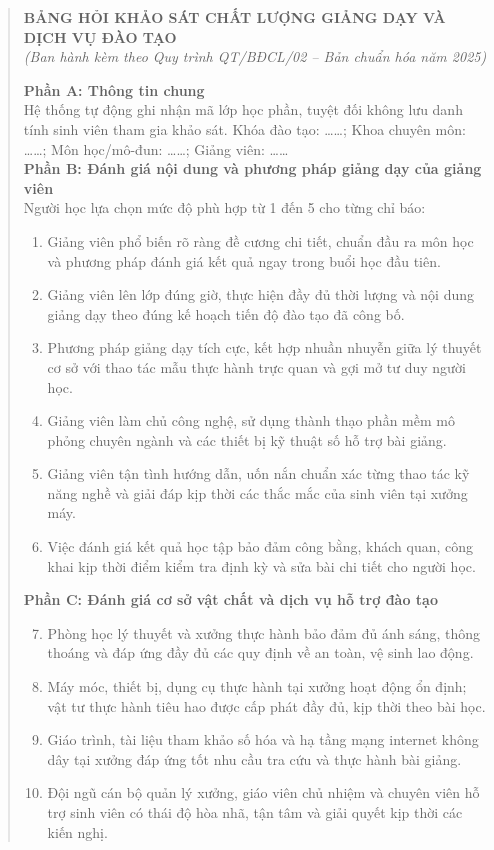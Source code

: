 \begin{quote}
\centering
\textbf{BẢNG HỎI KHẢO SÁT CHẤT LƯỢNG GIẢNG DẠY VÀ DỊCH VỤ ĐÀO TẠO}\\[0.1cm]
\textit{(Ban hành kèm theo Quy trình QT/BĐCL/02 -- Bản chuẩn hóa năm 2025)}\\[0.3cm]
\raggedright

\textbf{Phần A: Thông tin chung}\\[0.15cm]
Hệ thống tự động ghi nhận mã lớp học phần, tuyệt đối không lưu danh tính sinh viên tham gia khảo sát. Khóa đào tạo: \dots\dots; Khoa chuyên môn: \dots\dots; Môn học/mô-đun: \dots\dots; Giảng viên: \dots\dots\\[0.3cm]

\textbf{Phần B: Đánh giá nội dung và phương pháp giảng dạy của giảng viên}\\[0.15cm]
Người học lựa chọn mức độ phù hợp từ 1 đến 5 cho từng chỉ báo:
\begin{enumerate}
    \item Giảng viên phổ biến rõ ràng đề cương chi tiết, chuẩn đầu ra môn học và phương pháp đánh giá kết quả ngay trong buổi học đầu tiên.
    \item Giảng viên lên lớp đúng giờ, thực hiện đầy đủ thời lượng và nội dung giảng dạy theo đúng kế hoạch tiến độ đào tạo đã công bố.
    \item Phương pháp giảng dạy tích cực, kết hợp nhuần nhuyễn giữa lý thuyết cơ sở với thao tác mẫu thực hành trực quan và gợi mở tư duy người học.
    \item Giảng viên làm chủ công nghệ, sử dụng thành thạo phần mềm mô phỏng chuyên ngành và các thiết bị kỹ thuật số hỗ trợ bài giảng.
    \item Giảng viên tận tình hướng dẫn, uốn nắn chuẩn xác từng thao tác kỹ năng nghề và giải đáp kịp thời các thắc mắc của sinh viên tại xưởng máy.
    \item Việc đánh giá kết quả học tập bảo đảm công bằng, khách quan, công khai kịp thời điểm kiểm tra định kỳ và sửa bài chi tiết cho người học.
\end{enumerate}

\textbf{Phần C: Đánh giá cơ sở vật chất và dịch vụ hỗ trợ đào tạo}\\[0.15cm]
\begin{enumerate}
    \setcounter{enumi}{6}
    \item Phòng học lý thuyết và xưởng thực hành bảo đảm đủ ánh sáng, thông thoáng và đáp ứng đầy đủ các quy định về an toàn, vệ sinh lao động.
    \item Máy móc, thiết bị, dụng cụ thực hành tại xưởng hoạt động ổn định; vật tư thực hành tiêu hao được cấp phát đầy đủ, kịp thời theo bài học.
    \item Giáo trình, tài liệu tham khảo số hóa và hạ tầng mạng internet không dây tại xưởng đáp ứng tốt nhu cầu tra cứu và thực hành bài giảng.
    \item Đội ngũ cán bộ quản lý xưởng, giáo viên chủ nhiệm và chuyên viên hỗ trợ sinh viên có thái độ hòa nhã, tận tâm và giải quyết kịp thời các kiến nghị.
\end{enumerate}


\end{quote}
